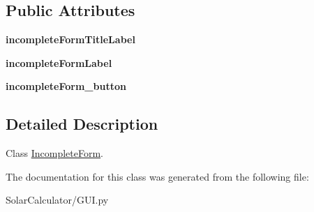 \subsection*{Public Attributes}
\begin{DoxyCompactItemize}
\item 
\hypertarget{class_solar_calculator_1_1_g_u_i_1_1_incomplete_form_aa615111142e66f3c261b3f4fb64e37c1}{{\bfseries incomplete\-Form\-Title\-Label}}\label{class_solar_calculator_1_1_g_u_i_1_1_incomplete_form_aa615111142e66f3c261b3f4fb64e37c1}

\item 
\hypertarget{class_solar_calculator_1_1_g_u_i_1_1_incomplete_form_a5e0d1ddebfc86b173cde10a829ebd4aa}{{\bfseries incomplete\-Form\-Label}}\label{class_solar_calculator_1_1_g_u_i_1_1_incomplete_form_a5e0d1ddebfc86b173cde10a829ebd4aa}

\item 
\hypertarget{class_solar_calculator_1_1_g_u_i_1_1_incomplete_form_a8607dd329917e345f5cbcc1212ea9fb9}{{\bfseries incomplete\-Form\-\_\-button}}\label{class_solar_calculator_1_1_g_u_i_1_1_incomplete_form_a8607dd329917e345f5cbcc1212ea9fb9}

\end{DoxyCompactItemize}


\subsection{Detailed Description}
Class \hyperlink{class_solar_calculator_1_1_g_u_i_1_1_incomplete_form}{Incomplete\-Form}. 

The documentation for this class was generated from the following file\-:\begin{DoxyCompactItemize}
\item 
Solar\-Calculator/G\-U\-I.\-py\end{DoxyCompactItemize}
